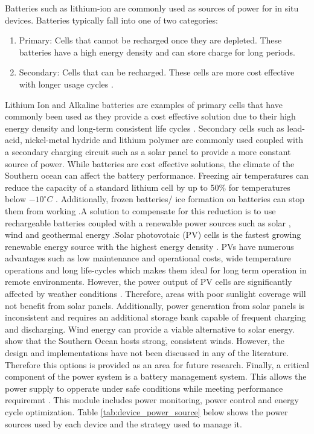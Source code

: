 Batteries such as lithium-ion are commonly used as sources of power for in situ devices. Batteries typically fall into one of two categories:
\begin{enumerate}
	\item Primary: Cells that cannot be recharged once they are depleted. These batteries have a high energy density and can store charge for long periods.\cite{besenhard2008handbook}
	\item Secondary: Cells that can be recharged. These cells are more cost effective with longer usage cycles \cite{besenhard2008handbook}.
\end{enumerate}
 
Lithium  Ion and Alkaline batteries are examples of primary cells that have commonly been used as they provide a cost effective solution due to their high energy density and long-term consistent life cycles \cite{zareer2018review}.  Secondary cells such as lead-acid, nickel-metal hydride and lithium polymer are commonly used coupled with a secondary charging circuit such as a solar panel \cite{manimekalai2013overview} to provide a more constant source of power. While batteries are cost effective solutions, the climate of the Southern ocean can affect the battery performance. Freezing air temperatures can reduce the capacity of a standard lithium cell by up to 50\% for temperatures below $-10^\circ C$ \cite{doble2017robust,ZHANG2003137}. Additionally, frozen batteries/ ice formation on batteries can stop them from working \cite{doble2017robust,manimekalai2013overview}.A solution to compensate for this reduction is to use rechargeable batteries coupled with a renewable power sources such as solar \cite{doble2017robust,rabault2019open}, wind and geothermal energy \cite{manimekalai2013overview}.Solar photovotaic (PV) cells is the fastest growing renewable energy source with the highest energy density \cite{jordehi2016parameter}. PVs have numerous advantages such as low maintenance and operational costs, wide temperature operations and long life-cycles \cite{jordehi2016parameter} which makes them ideal for long term operation in remote environments. However, the power output of PV cells are significantly affected by weather conditions \cite{sharma2015solar}. Therefore, areas with poor sunlight coverage will not benefit from solar panels. Additionally, power generation from solar panels is inconsistent and requires an additional storage bank capable of frequent charging and discharging. Wind energy can provide a viable alternative to solar energy. \textcite{vichi2019effects} show that the Southern Ocean hosts strong, consistent winds. However, the design and implementations have not been discussed in any of the literature. Therefore this options is provided as an area for future research. Finally, a critical component of the power system is a battery management system. This allows the power supply to opperate under safe conditions while meeting performance requiremnt \cite{vidal2019xev}. This module includes power monitoring, power control and energy cycle optimization. Table \ref{tab:device_power_source} below shows the power sources used by each device and the strategy used to manage it.
